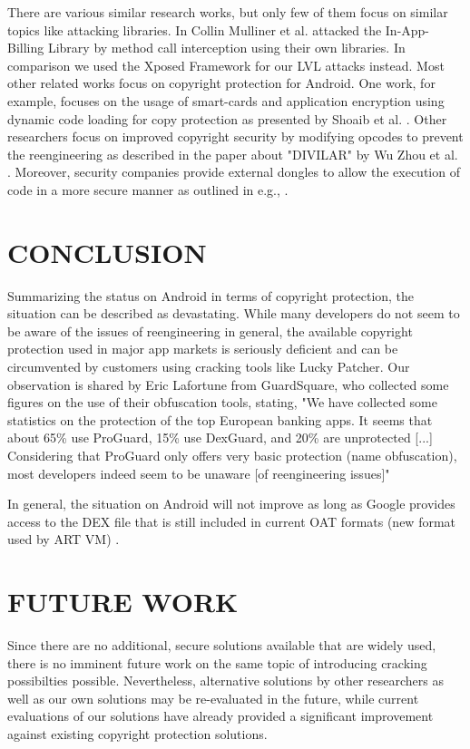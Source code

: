 \documentclass{sig-alternate}
\begin{document}
There are various similar research works, but only few of them focus on similar topics like attacking libraries. In \cite{mulliner} Collin Mulliner et al. attacked the In-App-Billing Library by method call interception using their own libraries. In comparison we used the Xposed Framework for our LVL attacks instead. Most other related works focus on copyright protection for Android. One work, for example, focuses on the usage of smart-cards and application encryption using dynamic code loading for copy protection as presented by Shoaib et al. \cite{RW1}. Other researchers focus on improved copyright security by modifying opcodes to prevent the reengineering as described in the paper about "DIVILAR" by Wu Zhou et al. \cite{RW3}. Moreover, security companies provide external dongles to allow the execution of code in a more secure manner as outlined in e.g., \cite{RW2}.

\section{CONCLUSION}

Summarizing the status on Android in terms of copyright protection, the situation can be described as devastating. While many developers do not seem to be aware of the issues of reengineering in general, the available copyright protection used in major app markets is seriously deficient and can be circumvented by customers using cracking tools like Lucky Patcher. Our observation is shared by Eric Lafortune from GuardSquare, who collected some figures on the use of their obfuscation tools, stating, "We have collected some statistics on the protection of the top European banking apps. It seems that about 65\% use ProGuard, 15\% use DexGuard, and 20\% are unprotected [...] Considering that ProGuard only offers very basic protection (name obfuscation), most developers indeed seem to be unaware [of reengineering issues]" \cite{lafor}

In general, the situation on Android will not improve as long as Google provides access to the DEX file that is still included in current OAT formats (new format used by ART VM) \cite{xAT11} \cite{nils}.

\section{FUTURE WORK}

Since there are no additional, secure solutions available that are widely used, there is no imminent future work on the same topic of introducing cracking possibilties possible. Nevertheless, alternative solutions by other researchers as well as our own solutions may be re-evaluated in the future, while current evaluations of our solutions have already provided a significant improvement against existing copyright protection solutions.
\end{document}
